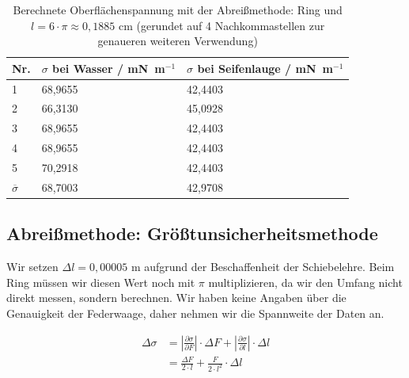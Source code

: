 \documentclass{article}
\begin{document}
\begin{table}[h]
\caption{Berechnete Oberflächenspannung mit der Abreißmethode: Ring und $l = 6\cdot \pi \approx 0,1885$ cm (gerundet auf 4 Nachkommastellen zur genaueren weiteren Verwendung)}
\begin{tabular}{lll}
Nr. & \shortstack[l]{$\sigma$ bei\\Wasser / mN~m${}^{-1}$} & \shortstack[l]{$\sigma$ bei\\Seifenlauge / mN~m${}^{-1}$} \\
\hline
1 & 68,9655 & 42,4403 \\
2 & 66,3130 & 45,0928 \\
3 & 68,9655 & 42,4403 \\
4 & 68,9655 & 42,4403 \\
5 & 70,2918 & 42,4403 \\
\hline
$\overline{\sigma}$ & 68,7003 & 42,9708
\end{tabular}
\end{table}


\subsection{Abreißmethode: Größtunsicherheitsmethode}

Wir setzen $\Delta l = 0,00005$ m aufgrund der Beschaffenheit der Schiebelehre. Beim Ring müssen wir diesen Wert noch mit $\pi$ multiplizieren, da wir den Umfang nicht direkt messen, sondern berechnen. Wir haben keine Angaben über die Genauigkeit der Federwaage, daher nehmen wir die Spannweite der Daten an. 

\begin{align*}
\Delta\sigma &= \left| \frac{\partial \sigma}{\partial F}\right| \cdot \Delta F + \left| \frac{\partial \sigma}{\partial l}\right| \cdot \Delta l \\
&= \frac{\Delta F}{2\cdot l} + \frac{F}{2\cdot  l^2}\cdot \Delta l
\end{align*}
\end{document}
